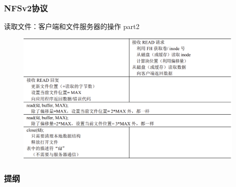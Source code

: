 \begin{frame}[fragile]
    \frametitle{NFSv2协议}
    读取文件：客户端和文件服务器的操作 part2
    \begin{figure}
        \includegraphics[width=0.7\linewidth]{figs/nfsv2-read-2.png}
    \end{figure}
    
\end{frame}

\begin{frame}
    \frametitle{提纲} %
    \tableofcontents %
    
    
\end{frame}
